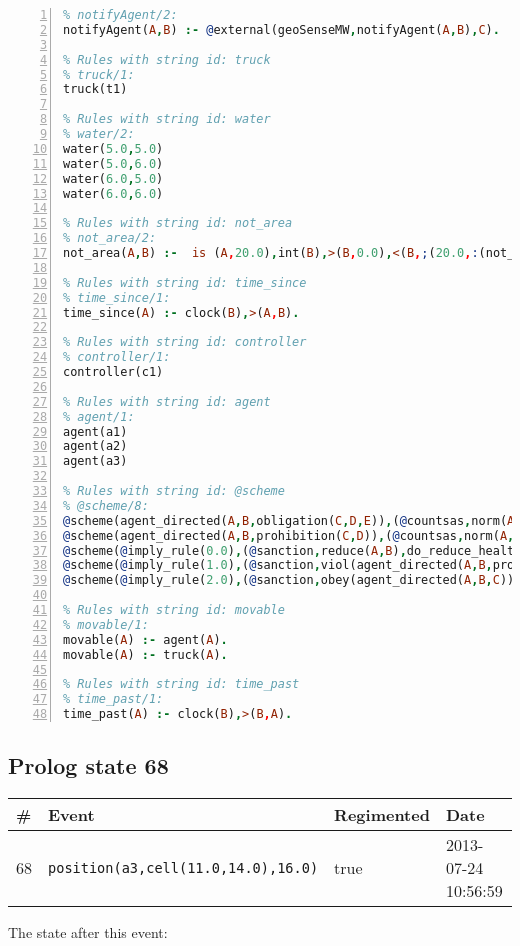 \documentclass[11pt]{article}\usepackage[utf8]{inputenc}\usepackage{geometry}
\begin{document}
\begin{lstlisting}[language=Prolog, numbers=left]
% Rules with string id: notifyAgent
% notifyAgent/2:
notifyAgent(A,B) :- @external(geoSenseMW,notifyAgent(A,B),C).

% Rules with string id: truck
% truck/1:
truck(t1)

% Rules with string id: water
% water/2:
water(5.0,5.0)
water(5.0,6.0)
water(6.0,5.0)
water(6.0,6.0)

% Rules with string id: not_area
% not_area/2:
not_area(A,B) :-  is (A,20.0),int(B),>(B,0.0),<(B,;(20.0,:(not_area(A,B), is (-(B),20.0)))),int(A),>(A,0.0),<(A,;(20.0,:(area(A,B),-(int(A))))),int(B),>(A,0.0),>(B,0.0),<(A,21.0),<(B,21.0).

% Rules with string id: time_since
% time_since/1:
time_since(A) :- clock(B),>(A,B).

% Rules with string id: controller
% controller/1:
controller(c1)

% Rules with string id: agent
% agent/1:
agent(a1)
agent(a2)
agent(a3)

% Rules with string id: @scheme
% @scheme/8:
@scheme(agent_directed(A,B,obligation(C,D,E)),(@countsas,norm(A,B,F,obligation(C,D,E)),F),false,(listTrue(C)),(time_past(D)),false,[plus(viol(agent_directed(A,B,obligation(C,D,E))))|[]],[plus(obey(agent_directed(A,B,obligation(C,D,E))))|[]])
@scheme(agent_directed(A,B,prohibition(C,D)),(@countsas,norm(A,B,E,prohibition(C,D)),E),(listTrue(C)),false,(false),false,[plus(viol(agent_directed(A,B,prohibition(C,D))))|[]],[plus(obey(agent_directed(A,B,prohibition(C,D))))|[]])
@scheme(@imply_rule(0.0),(@sanction,reduce(A,B),do_reduce_health(A,B),notifyAgent(A,changed(status))),true,false,false,false,[min(reduce(A,B))|[]],[])
@scheme(@imply_rule(1.0),(@sanction,viol(agent_directed(A,B,prohibition(C,D))),do_sanction(D)),true,false,false,false,[min(viol(agent_directed(A,B,prohibition(C,D))))|[]],[])
@scheme(@imply_rule(2.0),(@sanction,obey(agent_directed(A,B,C))),true,false,false,false,[min(obey(agent_directed(A,B,C)))|[]],[])

% Rules with string id: movable
% movable/1:
movable(A) :- agent(A).
movable(A) :- truck(A).

% Rules with string id: time_past
% time_past/1:
time_past(A) :- clock(B),>(B,A).

\end{lstlisting}
\clearpage 
\subsection{Prolog state 68}
\begin{table}[ht]
\centering 
\begin{tabular}{l l l l} 
\textbf{\#} & \textbf{Event} & \textbf{Regimented} & \textbf{Date} \\ [0.5ex] 
\hline
68&\texttt{position(a3,cell(11.0,14.0),16.0)}&true&2013-07-24 10:56:59\\ [1ex] \hline\end{tabular}
\end{table}
The state after this event:
\end{document}
